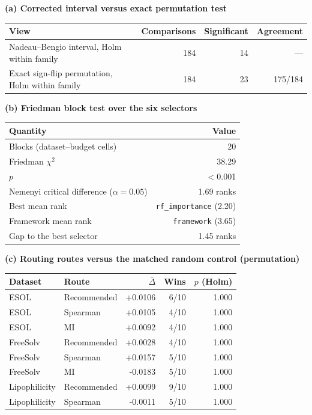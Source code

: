 \begin{table}[H]
\renewcommand{\thetable}{S19}
\centering
\small
\textbf{(a) Corrected interval versus exact permutation test}\par\smallskip
\begin{tabular}{lrrr}
\toprule
View & Comparisons & Significant & Agreement \\
\midrule
Nadeau--Bengio interval, Holm within family & 184 & 14 & --- \\
Exact sign-flip permutation, Holm within family & 184 & 23 & 175/184 \\
\bottomrule
\end{tabular}\par\medskip
\textbf{(b) Friedman block test over the six selectors}\par\smallskip
\begin{tabular}{lr}
\toprule
Quantity & Value \\
\midrule
Blocks (dataset--budget cells) & 20 \\
Friedman $\chi^2$ & 38.29 \\
$p$ & $<$0.001 \\
Nemenyi critical difference ($\alpha=0.05$) & 1.69 ranks \\
Best mean rank & \texttt{rf\_importance} (2.20) \\
Framework mean rank & \texttt{framework} (3.65) \\
Gap to the best selector & 1.45 ranks \\
\bottomrule
\end{tabular}\par\medskip
\textbf{(c) Routing routes versus the matched random control (permutation)}\par\smallskip
\begin{tabular}{llrrr}
\toprule
Dataset & Route & $\bar\Delta$ & Wins & $p$ (Holm) \\
\midrule
ESOL & Recommended & +0.0106 & 6/10 & 1.000 \\
ESOL & Spearman & +0.0105 & 4/10 & 1.000 \\
ESOL & MI & +0.0092 & 4/10 & 1.000 \\
FreeSolv & Recommended & +0.0028 & 4/10 & 1.000 \\
FreeSolv & Spearman & +0.0157 & 5/10 & 1.000 \\
FreeSolv & MI & -0.0183 & 5/10 & 1.000 \\
Lipophilicity & Recommended & +0.0099 & 9/10 & 1.000 \\
Lipophilicity & Spearman & -0.0011 & 5/10 & 1.000 \\

\end{tabular}
\end{table}
